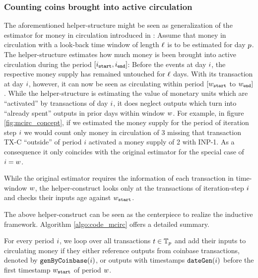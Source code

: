 \subsubsection{Counting coins brought into active circulation}

The aforementioned helper-structure might be seen as generalization of the estimator for money in circulation introduced in \cite{pernice2019cryptocurrencies}: %
Assume that money in circulation with a look-back time window of length \({\ell}\) is to be estimated for day \({p}\). %
The helper-structure estimates how much money is been brought into active circulation during the period \([{i}_{{\mathtt{start}}},{i}_{{\mathtt{end}}}]\): Before the events at day \({i}\), the respective money supply has remained untouched for \({\ell}\) days. With its transaction at day \({i}\), however, it can now be seen as circulating within period  \([{w}_{\mathtt{start}}\) to \({w}_{\mathtt{end}}]\). %
While the helper-structure is estimating the value of monetary units which are ``activated'' by transactions of day \( {i} \), it does neglect outputs which turn into ``already spent'' outputs in prior days within window \({w}\). %
For example, in figure \ref{fig:mcirc_concept}, if we estimated the money supply for the period of iteration step \({i}\) we would count only money in circulation of 3 missing that transaction TX-C ``outside'' of period \(i\) activated a money supply of 2 with INP-1. %
As a consequence it only coincides with the original estimator for the special case of \({i} = {w}\). %

While the original estimator requires the information of each transaction in time-window \({w}\), the helper-construct looks only at the transactions of iteration-step \({i}\) and checks their inputs age against \({w}_{\mathtt{start}}\). %

The above helper-construct can be seen as the centerpiece to realize the inductive framework. %
Algorithm \ref{algo:code_mcirc} offers a detailed summary. %

For every period ${i}$, we loop over all transactions $t\in{{\mathbb{T}}_{p}}$ and add
their inputs to circulating money if they either reference outputs from
coinbase transactions, denoted by ${\mathtt{genByCoinbase}}(i)$, or outputs with
timestamps ${\mathtt{dateGen}}(i)$ before the first timestamp ${w}_{\mathtt{start}}$ of period
${w}$.  %
%
%
%



